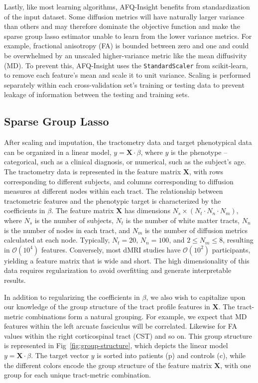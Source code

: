 Lastly, like most learning algorithms, AFQ-Insight benefits from standardization of the input dataset. Some diffusion metrics will have naturally larger variance than others and may therefore dominate the objective function and make the sparse group lasso estimator unable to learn from the lower variance metrics. For example, fractional anisotropy (FA) is bounded between zero and one and could be overwhelmed by an unscaled higher-variance metric like the mean diffusivity (MD). To prevent this, AFQ-Insight uses the \lstinline{StandardScaler} from scikit-learn\cite{scikit-learn}, to remove each feature's mean and scale it to unit variance. Scaling is performed separately within each cross-validation set's training or testing data to prevent leakage of information between the testing and training sets\cite{kaufman2012leakage}.

\subsection*{Sparse Group Lasso}

After scaling and imputation, the tractometry data and target phenotypical data can be organized in a linear model, $y = \mathbf{X} \cdot \beta$, where $y$ is the phenotype -- categorical, such as a clinical diagnosis, or numerical, such as the subject's age. The tractometry data is represented in the feature matrix $\mathbf{X}$, with rows corresponding to different subjects, and columns corresponding to diffusion measures at different nodes within each tract. The relationship between tractometric features and the phenotypic target is characterized by the coefficients in $\beta$. The feature matrix $\mathbf{X}$ has dimensions $N_s \times (N_t \cdot N_n \cdot N_m)$, where $N_s$ is the number of subjects, $N_t$ is the number of white matter tracts, $N_n$ is the number of nodes in each tract, and $N_m$ is the number of diffusion metrics calculated at each node. Typically, $N_t = 20$, $N_n = 100$, and $2 \le N_m \le 8$, resulting in $\mathcal{O}(10^4)$ features. Conversely, most dMRI studies have $\mathcal{O}(10^2)$ participants, yielding a feature matrix that is wide and short. The high dimensionality of this data requires regularization to avoid overfitting and generate interpretable results.

In addition to regularizing the coefficients in $\beta$, we also wish to capitalize upon our knowledge of the group structure of the tract profile features in $\mathbf{X}$. The tract-metric combinations form a natural grouping. For example, we expect that MD features within the left arcuate fasciculus will be correlated. Likewise for FA values within the right corticospinal tract (CST) and so on. This group structure is represented in Fig~\ref{fig:group-structure}, which depicts the linear model $y = \mathbf{X} \cdot \beta$. The target vector $y$ is sorted into patients (p) and controls (c), while the different colors encode the group structure of the feature matrix $\mathbf{X}$, with one group for each unique tract-metric combination.


